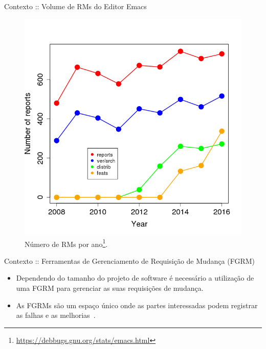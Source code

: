 \documentclass[t,14pt,mathserif]{beamer}
\begin{document}
\begin{frame}{Contexto :: Volume de RMs do Editor Emacs}
    \begin{figure}[htpb]
        \centering
        \includegraphics[width=.45\linewidth]{../img/sample.png}
\caption{Número de RMs por ano\footnote{\url{https://debbugs.gnu.org/stats/emacs.html}}.}
\label{fig:emacs_num_rm_por_ano}
    \end{figure}
\end{frame}

\begin{frame}{Contexto :: Ferramentas de Gerenciamento de Requisição de Mudança (FGRM)}
	\begin{itemize}
        \item Dependendo do tamanho do projeto de software é necessário a
              utilização de uma \alert{FGRM} para gerenciar as suas requisições de
              mudança.
        \item As \alert{FGRMs} são um espaço único onde as partes interessadas
              podem registrar as falhas e as melhorias~\cite{1407819}.
	\end{itemize}
\end{frame}
\end{document}
